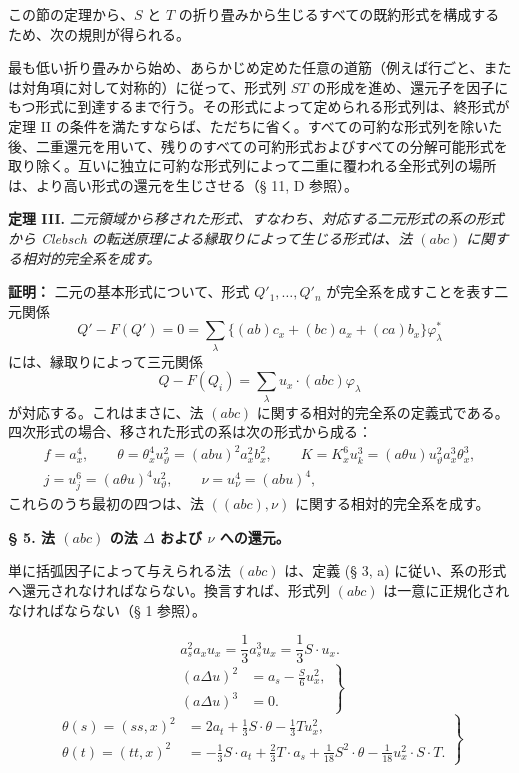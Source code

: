 \documentclass[11pt]{article}
\newcommand{\A}{\Delta}
\begin{document}
この節の定理から、$S$ と $T$ の折り畳みから生じるすべての既約形式を構成するため、次の規則が得られる。

最も低い折り畳みから始め、あらかじめ定めた任意の道筋（例えば行ごと、または対角項に対して対称的）に従って、形式列 $ST$ の形成を進め、還元子を因子にもつ形式に到達するまで行う。その形式によって定められる形式列は、終形式が定理 II の条件を満たすならば、ただちに省く。すべての可約な形式列を除いた後、二重還元を用いて、残りのすべての可約形式およびすべての分解可能形式を取り除く。互いに独立に可約な形式列によって二重に覆われる全形式列の場所は、より高い形式の還元を生じさせる（§ 11, D 参照）。

\clearpage
\noindent\textbf{定理 III.}
\emph{二元領域から移された形式、すなわち、対応する二元形式の系の形式から Clebsch の転送原理による縁取りによって生じる形式は、法 $(abc)$ に関する相対的完全系を成す。}

\noindent\textbf{証明：}
二元の基本形式について、形式 $Q'_1,\ldots,Q'_n$ が完全系を成すことを表す二元関係
\[
Q'-F(Q')=0=\sum_\lambda\bigl\{(ab)c_x+(bc)a_x+(ca)b_x\bigr\}\varphi_\lambda^{*}
\]
には、縁取りによって三元関係
\[
Q-F(Q_i)=\sum_\lambda u_x\cdot(abc)\varphi_\lambda
\]
が対応する。これはまさに、法 $(abc)$ に関する相対的完全系の定義式である。四次形式の場合、移された形式の系は次の形式から成る：
\[
\begin{gathered}
f=a_x^4,\qquad
\theta=\theta_x^4u_\vartheta^2=(abu)^2a_x^2b_x^2,\qquad
K=K_x^6u_k^3=(a\theta u)u_\vartheta^2a_x^3\theta_x^3,\\
j=u_j^6=(a\theta u)^4u_\vartheta^2,\qquad
\nu=u_\nu^4=(abu)^4,
\end{gathered}
\]
これらのうち最初の四つは、法 $((abc),\nu)$ に関する相対的完全系を成す。

\begin{center}
\textbf{§ 5. \quad 法 $(abc)$ の法 $\A$ および $\nu$ への還元。}
\end{center}

単に括弧因子によって与えられる法 $(abc)$ は、定義 (§ 3, a) に従い、系の形式へ還元されなければならない。換言すれば、形式列 $(abc)$ は一意に正規化されなければならない（§ 1 参照）。

\[
a_s^2a_xu_x=\frac13 a_s^3u_x=\frac13 S\cdot u_x. \tag{2}
\]
\[
\left.
\begin{aligned}
(a\A u)^2&=a_s-\frac{S}{6}u_x^2,\\
(a\A u)^3&=0.
\end{aligned}
\right\} \tag{3}
\]
\[
\left.
\begin{aligned}
\theta(s)=(ss,x)^2&=2a_t+\frac13 S\cdot\theta-\frac13 Tu_x^2,\\
\theta(t)=(tt,x)^2&=-\frac13 S\cdot a_t+\frac23 T\cdot a_s+\frac1{18}S^2\cdot\theta-\frac1{18}u_x^2\cdot S\cdot T.
\end{aligned}
\right\} \tag{4}
\]
\end{document}
